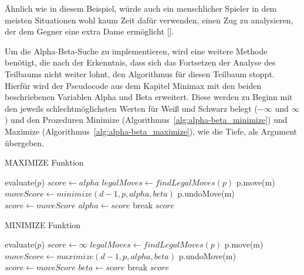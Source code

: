 Ähnlich wie in diesem Beispiel, würde auch ein menschlicher Spieler in dem meisten Situationen wohl kaum Zeit dafür verwenden, einen Zug zu analysieren, der dem Gegner eine extra Dame ermöglicht [\cite{Paulsen2009}].

Um die Alpha-Beta-Suche zu implementieren, wird eine weitere Methode benötigt, die nach der Erkenntnis, dass sich das Fortsetzen der Analyse des Teilbaums nicht weiter lohnt, den Algorithmus für diesen Teilbaum stoppt.
Hierfür wird der Pseudocode aus dem Kapitel Minimax mit den beiden beschriebenen Variablen Alpha und Beta erweitert.
Diese werden zu Beginn mit den jeweils schlechtmöglichsten Werten für Weiß und Schwarz belegt ($-\infty$ und $\infty$) und den Prozeduren Minimize (Algorithmus~\ref{alg:alpha-beta_minimize}) und Maximize (Algorithmus~\ref{alg:alpha-beta_maximize}), wie die Tiefe, als Argument übergeben.

\begin{algorithm}
    \caption{MAXIMIZE Funktion}
    \label{alg:alpha-beta_maximize}
    \begin{algorithmic}[1]
        \State \Return evaluate($p$)
        \Else
        \State $score \gets alpha$
        \State $legalMoves \gets findLegalMoves(p)$
        \State p.move(m)
        \State $moveScore \gets minimize(d-1, p, alpha, beta)$
        \State p.undoMove(m)
        \State $score \gets moveScore$
        \State $alpha \gets score$
        \EndIf
        \EndIf
        \State break
        \EndIf
        \EndFor
        \EndIf
        \State \Return $score$
        \EndFunction
    \end{algorithmic}
\end{algorithm}

\begin{algorithm}
    \caption{MINIMIZE Funktion}
    \label{alg:alpha-beta_minimize}
    \begin{algorithmic}[1]
        \State \Return evaluate($p$)
        \Else
        \State $score \gets \infty$
        \State $legalMoves \gets findLegalMoves(p)$
        \State p.move(m)
        \State $moveScore \gets maximize(d-1, p, alpha, beta)$
        \State p.undoMove(m)
        \State $score \gets moveScore$
        \State $beta \gets score$
        \EndIf
        \EndIf
        \State break
        \EndIf
        \EndFor
        \EndIf
        \State \Return $score$
        \EndFunction
    \end{algorithmic}
\end{algorithm}
\newpage

